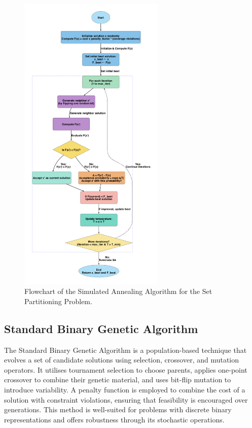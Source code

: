 \documentclass[12pt]{article}
\begin{document}
\begin{figure}[htbp]
  \centering
  \includegraphics[width=0.62\textwidth]{images/simulated_annealing_flowchart.png}
  \caption{Flowchart of the Simulated Annealing Algorithm for the Set Partitioning Problem.}
  \label{fig:flowchart1}
\end{figure}

\newpage

\subsection{Standard Binary Genetic Algorithm}
The Standard Binary Genetic Algorithm is a population-based technique that evolves a set of candidate solutions using selection, crossover, and mutation operators. 
It utilises tournament selection to choose parents, applies one-point crossover to combine their genetic material, and uses bit-flip mutation to introduce variability. 
A penalty function is employed to combine the cost of a solution with constraint violations, ensuring that feasibility is encouraged over generations. 
This method is well-suited for problems with discrete binary representations and offers robustness through its stochastic operations.
\end{document}
